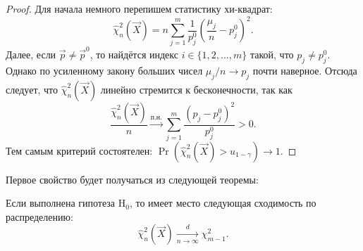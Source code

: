 \begin{proof}
	Для начала немного перепишем статистику хи-квадрат:
	\begin{equation}
		\hat{\chi}^{2}_{n}(\vec{X}) = n\sum_{j = 1}^{m} \frac{1}{p_{j}^{0}}\left(\frac{\mu_{j}}{n} - p_{j}^{0}\right)^{2}.
	\end{equation}
	Далее, если $\vec{p} \neq \vec{p}^{0}$, то найдётся индекс $i \in \{1, 2, \ldots, m\}$ такой, что $p_{j} \neq p_{j}^{0}$. Однако по усиленному закону больших чисел $\mu_{j}/n \to p_{j}$ почти наверное. Отсюда следует, что $\hat{\chi}^{2}_{n}(\vec{X})$ линейно стремится к бесконечности, так как
	\begin{equation}
		\frac{\hat{\chi}^{2}_{n}(\vec{X})}{n} \xrightarrow{\text{п.н.}} \sum_{j = 1}^{m} \frac{(p_{j} - p_{j}^{0})^{2}}{p_{j}^{0}} > 0.
	\end{equation}
	Тем самым критерий состоятелен: $\Pr(\hat{\chi}^{2}_{n}(\vec{X}) > u_{1 - \gamma}) \to 1$.
\end{proof}
Первое свойство будет получаться из следующей теоремы:
\begin{theorem}[Пирсона]
	Если выполнена гипотеза $\mathrm{H}_{0}$, то имеет место следующая сходимость по распределению:
	\begin{equation}
		\hat{\chi}^{2}_{n}(\vec{X}) \xrightarrow[n \to \infty]{d} \chi^{2}_{m - 1}.
	\end{equation}
\end{theorem}
